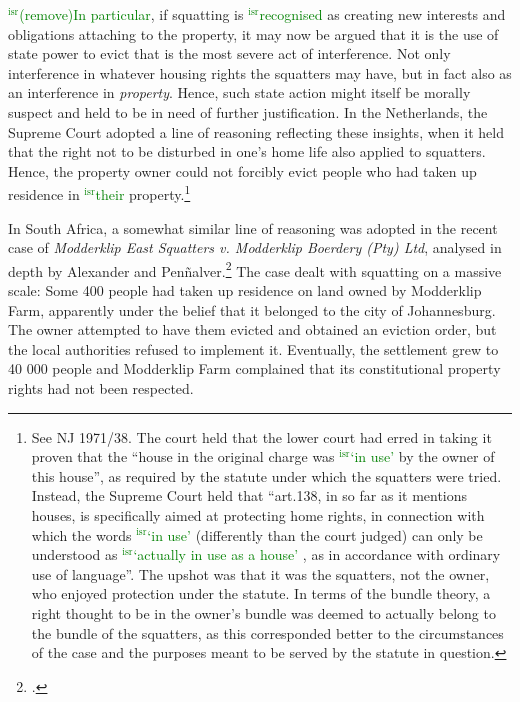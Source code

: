 \documentclass[12pt,a4paper]{book} %
\newcommand{\isr}[1]{\textcolor{green}{$^{\textrm{isr}}${#1}}}
\begin{document}
\isr{(remove)In particular}, if squatting is \isr{recognised} as creating new interests and obligations attaching to the property, it may now be argued that  it is the use of state power to evict that is the most severe act of interference. Not only interference in whatever housing rights the squatters may have, but in fact also as an interference in {\it property}. Hence, such state action might itself be morally suspect and held to be in need of further justification. In the Netherlands, the Supreme Court adopted a line of reasoning reflecting these insights, when it held that the right not to be disturbed in one's home life also applied to squatters. Hence, the property owner could not forcibly evict people who had taken up residence in \isr{their} property.\footnote{See NJ 1971/38. The court held that the lower court had erred in taking it proven that the ``house in the original charge was \isr{`in use'} by the owner of this house'', as required by the statute under which the squatters were tried. Instead, the Supreme Court held that ``art.138, in so far as it mentions houses, is specifically aimed at protecting home rights, in connection with which the words \isr{`in use'} (differently than the court judged) can only be understood as \isr{`actually in use as a house'} , as in accordance with ordinary use of language''. The upshot was that it was the squatters, not the owner, who enjoyed protection under the statute. In terms of the bundle theory, a right thought to be in the owner's bundle was deemed to actually belong to the bundle of the squatters, as this corresponded better to the circumstances of the case and the purposes meant to be served by the statute in question.}

In South Africa, a somewhat similar line of reasoning was adopted in the recent case of {\it Modderklip East Squatters v. Modderklip Boerdery (Pty) Ltd}, analysed in depth by Alexander and Pen\~{n}alver.\footcite[154-160]{alexander11} The case dealt with squatting on a massive scale: Some 400 people had taken up residence on land owned by Modderklip Farm, apparently under the belief that it belonged to the city of Johannesburg. The owner attempted to have them evicted and obtained an eviction order, but the local authorities refused to implement it. Eventually, the settlement grew to 40 000 people and Modderklip Farm complained that its constitutional property rights had not been respected.
\end{document}
